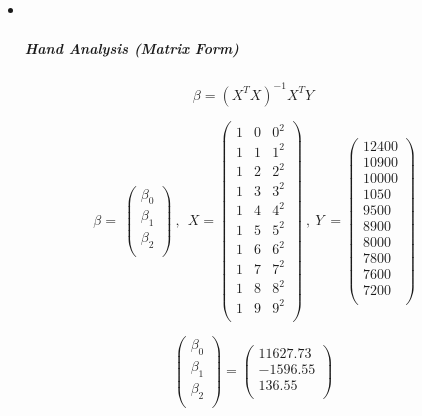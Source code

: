 \documentclass[
]{article}
\begin{document}
\begin{itemize}
\item ~
  \hypertarget{hand-analysis-matrix-form-1}{%
  \subparagraph{\texorpdfstring{\textbf{Hand Analysis (Matrix
  Form)}}{Hand Analysis (Matrix Form)}}\label{hand-analysis-matrix-form-1}}
\end{itemize}

\[\beta = {(X^{T}X)}^{- 1}X^{T}Y\]

\[\ \beta = \ \begin{pmatrix}
\beta_{0} \\
\beta_{1} \\
\beta_{2} \\
\end{pmatrix}\ ,\ \ X = \begin{pmatrix}
1 & 0 & 0^{2} \\
1 & 1 & 1^{2} \\
1 & 2 & 2^{2} \\
1 & 3 & 3^{2} \\
1 & 4 & 4^{2} \\
1 & 5 & 5^{2} \\
1 & 6 & 6^{2} \\
1 & 7 & 7^{2} \\
1 & 8 & 8^{2} \\
1 & 9 & 9^{2} \\
\end{pmatrix}\ ,\ Y\  = \begin{pmatrix}
12400 \\
10900 \\
10000 \\
1050 \\
9500 \\
8900 \\
8000 \\
7800 \\
7600 \\
7200 \\
\end{pmatrix}\]

\[\begin{pmatrix}
\beta_{0} \\
\beta_{1} \\
\beta_{2} \\
\end{pmatrix} = \begin{pmatrix}
11627.73 \\
 - 1596.55 \\
136.55 \\
\end{pmatrix}\]
\end{document}
